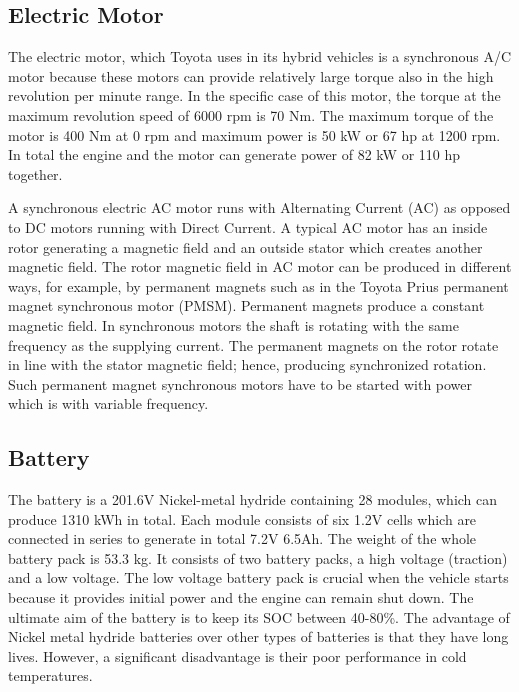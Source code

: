\subsection{Electric Motor}
The electric motor, which Toyota uses in its hybrid vehicles is a synchronous A/C motor because these motors can provide relatively large torque also in the high revolution per minute range. In the specific case of this motor, the torque at the maximum revolution speed of 6000 rpm is 70 Nm. The maximum torque of the motor is 400 Nm at 0 rpm and maximum power is 50 kW or 67 hp at 1200 rpm. In total the engine and the motor can generate power of 82 kW or 110 hp together.

A synchronous electric AC motor runs with Alternating Current (AC) as opposed to DC motors running with Direct Current. A typical AC motor has an inside rotor generating a magnetic field and an outside stator which creates another magnetic field. The rotor magnetic field in AC motor can be produced in different ways, for example, by permanent magnets such as in the Toyota Prius permanent magnet synchronous motor (PMSM). Permanent magnets produce a constant magnetic field. In synchronous motors the shaft is rotating with the same frequency as the supplying current. The permanent magnets on the rotor rotate in line with the stator magnetic field; hence, producing synchronized rotation. Such permanent magnet synchronous motors have to be started with power which is with variable frequency.

\subsection{Battery}
The battery is a 201.6V Nickel-metal hydride containing 28 modules, which can produce 1310 kWh in total. Each module consists of six 1.2V cells which are connected in series to generate in total 7.2V 6.5Ah. The weight of the whole battery pack is 53.3 kg. It consists of two battery packs, a high voltage (traction) and a low voltage. The low voltage battery pack is crucial when the vehicle starts because it provides initial power and the engine can remain shut down. The ultimate aim of the battery is to keep its SOC between 40-80\%. The advantage of Nickel metal hydride batteries over other types of batteries is that they have long lives. However, a significant disadvantage is their poor performance in cold temperatures. 

